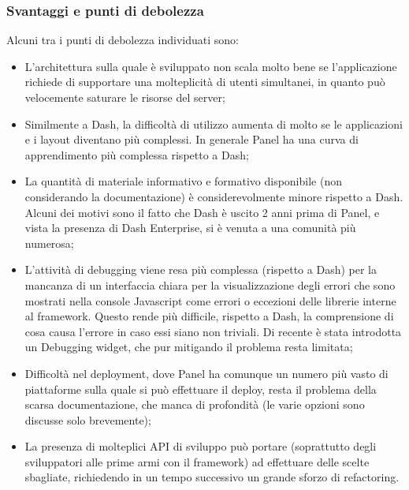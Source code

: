 \subsubsection{Svantaggi e punti di debolezza}
Alcuni tra i punti di debolezza individuati sono:
\begin{itemize}
\item L'architettura sulla quale è sviluppato non scala molto bene se l'applicazione richiede di supportare una molteplicità di utenti simultanei, in quanto può velocemente saturare le risorse del server;

\item Similmente a Dash, la difficoltà di utilizzo aumenta di molto se le applicazioni e i layout diventano più complessi. In generale Panel ha una curva di apprendimento più complessa rispetto a Dash;

\item La quantità di materiale informativo e formativo disponibile (non considerando la documentazione) è considerevolmente minore rispetto a Dash. Alcuni dei motivi sono il fatto che Dash è uscito 2 anni prima di Panel, e vista la presenza di Dash Enterprise, si è venuta a una comunità più numerosa;

\item L'attività di debugging viene resa più complessa (rispetto a Dash) per la mancanza di un interfaccia chiara per la visualizzazione degli errori che sono mostrati nella console Javascript come errori o eccezioni delle librerie interne al framework. Questo rende più difficile, rispetto a Dash, la comprensione di cosa causa l'errore in caso essi siano non triviali. Di recente è stata introdotta un Debugging widget, che pur mitigando il problema resta limitata;

\item Difficoltà nel deployment, dove Panel ha comunque un numero più vasto di piattaforme sulla quale si può effettuare il deploy, resta il problema della scarsa documentazione, che manca di profondità (le varie opzioni sono discusse solo brevemente);

\item La presenza di molteplici \gls{API} di sviluppo può portare (soprattutto degli sviluppatori alle prime armi con il framework) ad effettuare delle scelte sbagliate, richiedendo in un tempo successivo un grande sforzo di refactoring.

\end{itemize}

